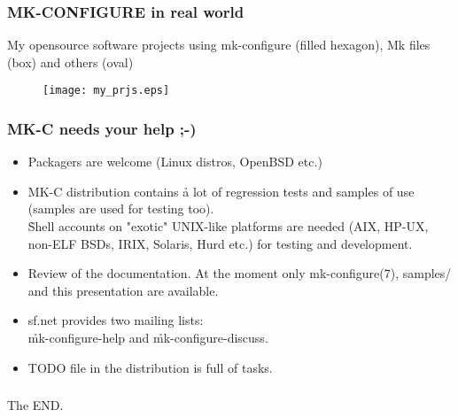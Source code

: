 \documentclass[hyperref={colorlinks=true}]{beamer}
\begin{document}


\begin{frame}[fragile,t]
  \frametitle{MK-CONFIGURE in real world}
  \begin{block}{My opensource software projects using
      mk-configure (filled hexagon), Mk files (box) and others (oval)}
    \begin{figure}
      \texttt{[image: my\_prjs.eps]}
    \end{figure}
  \end{block}
\end{frame}



\begin{frame}[fragile,t]
  \frametitle{MK-C needs your help ;-)}
  \begin{block}{}
  \begin{itemize}
  \item Packagers are welcome (Linux distros, OpenBSD etc.)
  \item MK-C distribution contains \h{a lot of regression tests and
    samples of use} (samples are used for testing too).\\
    \h{Shell accounts} on
    "exotic" UNIX-like platforms are needed (AIX, HP-UX, non-ELF BSDs,
    IRIX, Solaris, Hurd etc.) for testing and development.
  \item Review of the documentation. At the moment only mk-configure(7),
    samples/ and this presentation are available.
  \item sf.net provides two mailing lists:\\
    \h{mk-configure-help} and \h{mk-configure-discuss}.
  \item TODO file in the distribution is full of tasks.
  \end{itemize}
  \end{block}
\end{frame}


\begin{frame}[fragile]
  \frametitle{}
  \begin{block}{}
    \begin{center}
      \Huge{The END.}
    \end{center}
  \end{block}
\end{frame}


\end{document}

